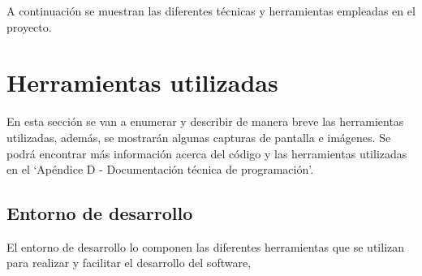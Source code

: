 
A continuación se muestran las diferentes técnicas y herramientas empleadas en el proyecto.

\section{Herramientas utilizadas}

En esta sección se van a enumerar y describir de manera breve las herramientas utilizadas, además, se mostrarán algunas capturas de pantalla e imágenes.
Se podrá encontrar más información acerca del código y las herramientas utilizadas en el 
`Apéndice D - Documentación técnica de programación'.


\subsection{Entorno de desarrollo}\label{sect:4_1_1_HerramientasDesarrollo}
El entorno de desarrollo lo componen las diferentes herramientas que se utilizan para realizar y facilitar el desarrollo del software,

